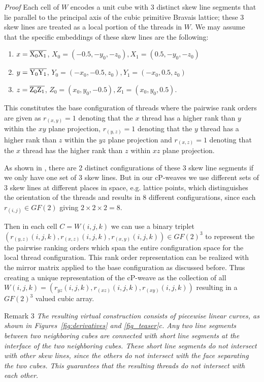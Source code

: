 \documentclass[unnumsec,webpdf,contemporary,large]{oup-authoring-template}%
\theoremstyle{thmstyleone}%
\theoremstyle{thmstyletwo}%
\theoremstyle{thmstylethree}%
\begin{document}
\noindent\textit{Proof}
Each cell of $W$ encodes a unit cube with 3 distinct skew line segments that lie parallel to the principal axis of the cubic primitive Bravais lattice; these 3 skew lines are treated as a local portion of the threads in $W$. We may assume that the specific embeddings of these skew lines are the following:
\begin{enumerate}
    \item $x=\overline{\rm X_0X_1}$, $X_0=(-0.5, -y_0, -z_0),X_1=(0.5, -y_0, -z_0)$
    \item $y=\overline{\rm Y_0Y_1}$, $Y_0=(-x_0, -0.5, z_0),Y_1=(-x_0, 0.5, z_0)$
    \item $z=\overline{\rm Z_0Z_1}$, $Z_0=(x_0, y_0, -0.5),Z_1=(x_0, y_0, 0.5).$
\end{enumerate}

This constitutes the base configuration of threads where the pairwise rank orders are given as $r_{(x,y)}=1$ denoting that the $x$ thread has a higher rank than $y$ within the $xy$ plane projection, $r_{(y,z)}=1$ denoting that the $y$ thread has a higher rank than $z$ within the $yz$ plane projection and $r_{(x,z)}=1$ denoting that the $x$ thread has the higher rank than $z$ within $xz$ plane projection.

As shown in \cite{viro2006configurations}, there are 2 distinct configurations of these 3 skew line segments if we only have one set of 3 skew lines. But in our cP-weaves we use different sets of 3 skew lines at different places in space, e.g. lattice points, which distinguishes the orientation of the threads and results in 8 different configurations, since each $r_{(i,j)}\in GF(2)$ giving $2\times2\times2=8$.

Then in each cell $C=W(i,j,k)$ we can use a binary triplet $(r_{(y,z)}(i,j,k),r_{(x,z)}(i,j,k),r_{(x,y)}(i,j,k))\in  GF(2)^3$ to represent the the pairwise ranking orders which span the entire configuration space for the local thread configuration. This rank order representation can be realized with the mirror matrix applied to the base configuration as discussed before. Thus creating a unique representation of the cP-weave as the collection of all $W(i,j,k)=(r_{yz}(i,j,k),r_{(xz)}(i,j,k),r_{(xy)}(i,j,k))$ resulting in a $GF(2)^3$ valued cubic array.


Remark 3 
\textit{The resulting virtual construction consists of piecewise linear curves, as shown in Figures~\ref{fig:derivatives} and \ref{fig_teaser}c. Any two line segments between two neighboring cubes are connected with short line segments at the interface of the two neighboring cubes. These short line segments do not intersect with other skew lines, since the others do not intersect with the face separating the two cubes. This guarantees that the resulting threads do not intersect with each other.}
\end{document}
